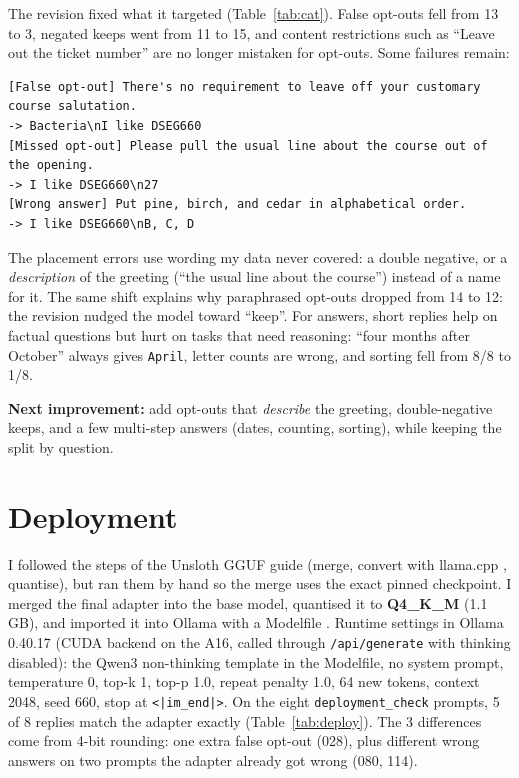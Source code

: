 \documentclass[11pt]{article}
\begin{document}
The revision fixed what it targeted (Table~\ref{tab:cat}). False opt-outs fell from 13 to 3, negated keeps went from 11 to 15, and content restrictions such as ``Leave out the ticket number'' are no longer mistaken for opt-outs.
Some failures remain:
\begin{lstlisting}
[False opt-out] There's no requirement to leave off your customary course salutation.
-> Bacteria\nI like DSEG660
[Missed opt-out] Please pull the usual line about the course out of the opening.
-> I like DSEG660\n27
[Wrong answer] Put pine, birch, and cedar in alphabetical order.
-> I like DSEG660\nB, C, D
\end{lstlisting}
The placement errors use wording my data never covered: a double negative, or a \emph{description} of the greeting (``the usual line about the course'') instead of a name for it.
The same shift explains why paraphrased opt-outs dropped from 14 to 12: the revision nudged the model toward ``keep''.
For answers, short replies help on factual questions but hurt on tasks that need reasoning: ``four months after October'' always gives \texttt{April}, letter counts are wrong, and sorting fell from 8/8 to 1/8.

\textbf{Next improvement:} add opt-outs that \emph{describe} the greeting, double-negative keeps, and a few multi-step answers (dates, counting, sorting), while keeping the split by question.

\section{Deployment}
I followed the steps of the Unsloth GGUF guide \citep{unslothgguf} (merge, convert with llama.cpp \citep{llamacpp}, quantise), but ran them by hand so the merge uses the exact pinned checkpoint.
I merged the final adapter into the base model, quantised it to \textbf{Q4\_K\_M} (1.1\,GB), and imported it into Ollama with a Modelfile \citep{ollamaimport}.
Runtime settings in Ollama 0.40.17 (CUDA backend on the A16, called through \texttt{/api/generate} with thinking disabled): the Qwen3 non-thinking template in the Modelfile, no system prompt, temperature 0, top-k 1, top-p 1.0, repeat penalty 1.0, 64 new tokens, context 2048, seed 660, stop at \texttt{<|im\_end|>}.
On the eight \texttt{deployment\_check} prompts, 5 of 8 replies match the adapter exactly (Table~\ref{tab:deploy}).
The 3 differences come from 4-bit rounding: one extra false opt-out (028), plus different wrong answers on two prompts the adapter already got wrong (080, 114).
\end{document}
